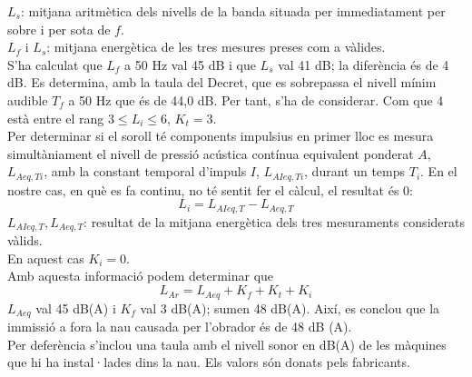 $L_s$: mitjana aritmètica dels nivells de la banda situada per immediatament per sobre i per sota de $f$.\\
$L_f$ i $L_s$: mitjana energètica de les tres mesures preses com a vàlides.\\
\newline S'ha calculat que \emph{$L_f$} a 50 Hz val 45 dB i que \emph{$L_s$} val 41 dB; la diferència és de 4 dB. Es determina, amb la taula del Decret, que es sobrepassa el nivell mínim audible $T_f$ a 50 Hz que és de 44,0 dB. Per tant, s'ha de considerar. Com que 4 està entre el rang $3 \leq  L_i \leq  6$,  $K_t = 3$.\\
\newline Per determinar si el soroll té components impulsius en primer lloc es mesura simultàniament el nivell de pressió acústica contínua equivalent ponderat $A$, $L_{Aeq,Ti}$, amb la constant temporal d'impuls $I$, $L_{AIeq,Ti}$, durant un temps $T_i$. En el nostre cas, en què es fa continu, no té sentit fer el càlcul, el resultat és 0:
\begin{equation}
L_i = L_{AIeq,T} - L_{Aeq,T}
\end{equation}
\noindent $L_{AIeq,T}, L_{Aeq,T}$: resultat de la mitjana energètica dels tres mesuraments considerats vàlids.\\
\newline En aquest cas $K_i = 0$.\\
\newline Amb aquesta informació podem determinar que 
\begin{equation}
L_{Ar} = L_{Aeq} + K_{f} + K_{t} + K_{i}
\end{equation}
\noindent \emph{$L_{Aeq}$} val 45 dB(A) i \emph{$K_{f}$} val 3 dB(A); sumen 48 dB(A).
\noindent Així, es conclou que la immissió a fora la nau causada per l'obrador és de 48 dB (A).\\
\newline Per deferència s'inclou una taula amb el nivell sonor en dB(A) de les màquines que hi ha instal·lades dins la nau. Els valors són donats pels fabricants.
